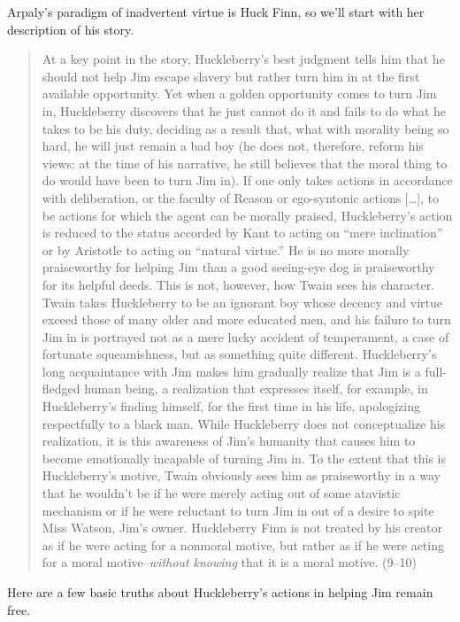 \documentclass[
  10pt,
  letterpaper,
  twoside]{scrbook}
\begin{document}
Arpaly's paradigm of inadvertent virtue is {Huck} Finn, so we'll start
with her description of his story.

\begin{quote}
At a key point in the story, {Huck}leberry's best judgment tells him
that he should not help Jim escape slavery but rather turn him in at the
first available opportunity. Yet when a golden opportunity comes to turn
Jim in, {Huck}leberry discovers that he just cannot do it and fails to
do what he takes to be his duty, deciding as a result that, what with
morality being so hard, he will just remain a bad boy (he does not,
therefore, reform his views: at the time of his narrative, he still
believes that the moral thing to do would have been to turn Jim in). If
one only takes actions in accordance with deliberation, or the faculty
of Reason or ego-syntonic actions {[}\ldots{]}, to be actions for which
the agent can be morally praised, {Huck}leberry's action is reduced to
the status accorded by Kant to acting on ``mere inclination'' or by
Aristotle to acting on ``natural virtue.'' He is no more morally
praiseworthy for helping Jim than a good seeing-eye dog is praiseworthy
for its helpful deeds. This is not, however, how Twain sees his
character. Twain takes {Huck}leberry to be an ignorant boy whose decency
and virtue exceed those of many older and more educated men, and his
failure to turn Jim in is portrayed not as a mere lucky accident of
temperament, a case of fortunate squeamishness, but as something quite
different. {Huck}leberry's long acquaintance with Jim makes him
gradually realize that Jim is a full-fledged human being, a realization
that expresses itself, for example, in {Huck}leberry's finding himself,
for the first time in his life, apologizing respectfully to a black man.
While {Huck}leberry does not conceptualize his realization, it is this
awareness of Jim's humanity that causes him to become emotionally
incapable of turning Jim in. To the extent that this is {Huck}leberry's
motive, Twain obviously sees him as praiseworthy in a way that he
wouldn't be if he were merely acting out of some atavistic mechanism or
if he were reluctant to turn Jim in out of a desire to spite Miss
Watson, Jim's owner. {Huck}leberry Finn is not treated by his creator as
if he were acting for a nonmoral motive, but rather as if he were acting
for a moral motive--\emph{without knowing} that it is a moral motive.
(9--10)
\end{quote}

Here are a few basic truths about {Huck}leberry's actions in helping Jim
remain free.
\end{document}
